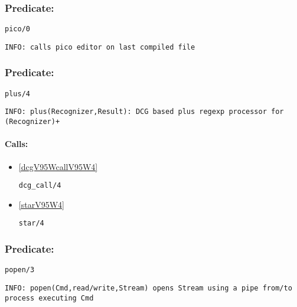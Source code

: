 \subsubsection{Predicate:} \label{picoV95W0}

\begin{verbatim}
pico/0
\end{verbatim}

{\small \begin{verbatim}
INFO: calls pico editor on last compiled file

\end{verbatim}}

\subsubsection{Predicate:} \label{plusV95W4}

\begin{verbatim}
plus/4
\end{verbatim}

{\small \begin{verbatim}
INFO: plus(Recognizer,Result): DCG based plus regexp processor for (Recognizer)+

\end{verbatim}}
\paragraph{Calls:} 
\begin{itemize}
\item \ref{dcgV95WcallV95W4} 
\begin{verbatim}
dcg_call/4
\end{verbatim}

\item \ref{starV95W4} 
\begin{verbatim}
star/4
\end{verbatim}

\end{itemize}

\subsubsection{Predicate:} \label{popenV95W3}

\begin{verbatim}
popen/3
\end{verbatim}

{\small \begin{verbatim}
INFO: popen(Cmd,read/write,Stream) opens Stream using a pipe from/to process executing Cmd

\end{verbatim}}
